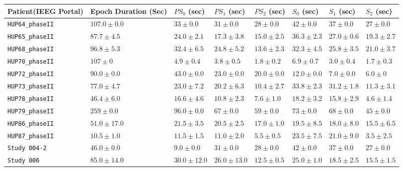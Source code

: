 \begin{table}[H]
    \scriptsize
    \centering
    \begin{tabular}{|x{2cm}|x{2.0cm}|x{1.0cm}|x{1.0cm}|x{1.0cm}|x{1.0cm}|x{1.0cm}|x{1.0cm}|}
        \hline
        Patient\newline (IEEG Portal) & Epoch Duration (Sec) & $PS_0$ (sec) & $PS_1$ (sec) & $PS_2$ (sec) & $S_0$ (sec) & $S_1$ (sec) & $S_2$ (sec) \\ \hline \hline
        \verb|HUP64_phaseII| & $107.0\pm0.0$ & $33\pm0.0$ & $31\pm0.0$ & $28\pm0.0$ & $42\pm0.0$ & $37\pm0.0$ & $27\pm0.0$\\ \hline
        \verb|HUP65_phaseII| & $87.7\pm4.5$ & $24.0\pm2.1$ & $17.3\pm3.8$ & $15.0\pm2.5$ & $36.3\pm2.3$ & $27.0\pm0.6$ & $19.3\pm2.7$\\ \hline
        \verb|HUP68_phaseII| & $96.8\pm5.3$ & $32.4\pm6.5$ & $24.8\pm5.2$ & $13.6\pm2.3$ & $32.3\pm4.5$ & $25.8\pm3.5$ & $21.0\pm3.7$\\ \hline
        \verb|HUP70_phaseII| & $107\pm0$ & $4.9\pm0.4$ & $3.8\pm0.5$ & $1.8\pm0.2$ & $6.9\pm0.7$ & $3.0\pm0.4$ & $1.7\pm0.3$\\ \hline
        \verb|HUP72_phaseII| & $90.0\pm0.0$ & $43.0\pm0.0$ & $23.0\pm0.0$ & $20.0\pm0.0$ & $12.0\pm0.0$ & $7.0\pm0.0$ & $6.0\pm0$\\ \hline
        \verb|HUP73_phaseII| & $77.0\pm4.7$ & $23.0\pm7.2$ & $20.2\pm6.3$ & $10.4\pm2.7$ & $33.8\pm2.3$ & $31.2\pm1.8$ & $11.3\pm3.1$\\ \hline
        \verb|HUP78_phaseII| & $46.4\pm6.0$ & $16.6\pm4.6$ & $10.8\pm2.3$ & $7.6\pm1.0$ & $18.2\pm3.2$ & $15.8\pm2.9$ & $4.6\pm1.4$\\ \hline
        \verb|HUP79_phaseII| & $259\pm0.0$ & $96.0\pm0.0$ & $67\pm0.0$ & $59\pm0.0$ & $73\pm0.0$ & $68\pm0.0$ & $45\pm0.0$\\ \hline
        \verb|HUP86_phaseII| & $51.0\pm17.0$ & $21.5\pm3.5$ & $20.5\pm2.5$ & $17.0\pm1.0$ & $19.5\pm8.5$ & $18.0\pm8.0$ & $15.5\pm6.5$\\ \hline
        \verb|HUP87_phaseII| & $10.5\pm1.0$ & $11.5\pm1.5$ & $11.0\pm2.0$ & $5.5\pm0.5$ & $23.5\pm7.5$ & $21.0\pm9.0$ & $3.5\pm2.5$\\ \hline
        \verb|Study 004-2|   & $46.0\pm0.0$ & $9.0\pm0.0$ & $31\pm0.0$ & $28\pm0.0$ & $42\pm0.0$ & $37\pm0.0$ & $27\pm0.0$\\ \hline
        \verb|Study 006|     & $85.0\pm14.0$ & $30.0\pm12.0$ & $26.0\pm13.0$ & $12.5\pm0.5$ & $25.0\pm1.0$ & $18.5\pm2.5$ & $15.5\pm1.5$\\ \hline

\end{tabular}
\end{table}
